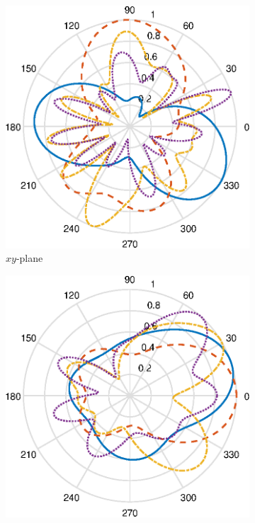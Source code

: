 \begin{figure}[H]
    \begin{subfigure}[b]{0.26\textwidth}
        \includegraphics[width=\textwidth]{img/ff_gpswifi_xy.eps}
        \caption{$xy$-plane}
        \label{fig:ff_xy_gpswifi}
    \end{subfigure}
    \begin{subfigure}[b]{0.26\textwidth}
        \includegraphics[width=\textwidth]{img/ff_gpswifi_xz.eps}

\end{subfigure}
\end{figure}
